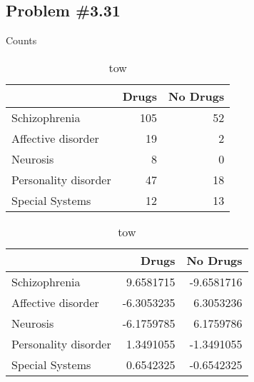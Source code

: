 \documentclass[12pt, letterpaper]{article}
\begin{document}
\subsection*{Problem {\#}3.31}
\outstanding{}




\begin{table}[!htb]
	\begin{minipage}{.5\linewidth}
		\caption{Counts}
		\centering \begin{table}[h]
			
			\caption{\label{tab:}one}
			\centering
			\begin{tabular}{lrr}
				\toprule
				& Drugs & No Drugs\\
				\midrule
				Schizophrenia & 105 & 52\\
				Affective disorder & 19 & 2\\
				Neurosis & 8 & 0\\
				Personality disorder & 47 & 18\\
				Special Systems & 12 & 13\\
				\bottomrule
			\end{tabular}
	\end{table} \end{minipage}%
	\begin{minipage}{.5\linewidth}
		\centering
		\caption{Perason Standard Residuals} \begin{table}[h]
			
			\caption{\label{tab:}tow}
			\centering
			\begin{tabular}{lrr}
				\toprule
				& Drugs & No Drugs\\
				\midrule
				Schizophrenia & 9.6581715 & -9.6581716\\
				Affective disorder & -6.3053235 & 6.3053236\\
				Neurosis & -6.1759785 & 6.1759786\\
				Personality disorder & 1.3491055 & -1.3491055\\
				Special Systems & 0.6542325 & -0.6542325\\
				\bottomrule
			\end{tabular}
	\end{table} \end{minipage} 
\end{table}
\end{document}
